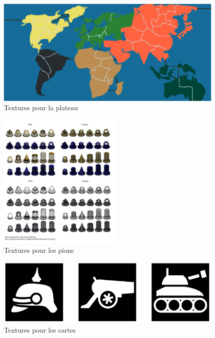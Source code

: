     \begin{figure}[!htbp]
        \centering
        \includegraphics[width=13cm]{Images/map_jeu.png}
        \caption{Textures pour la plateau}
        \label{fig:textures_plateau2}
    \end{figure}
    
    \begin{figure}[!htbp]
        \centering
        \includegraphics[width=6cm]{Images/pions.png}
        \caption{Textures pour les pions}
        \label{fig:textures_pions}
    \end{figure}
    
    
    \begin{figure}[!htbp]
        \centering
        \includegraphics[width=14cm]{Images/cartes.png}
        \caption{Textures pour les cartes}
        \label{fig:textures_cartes}
    \end{figure}